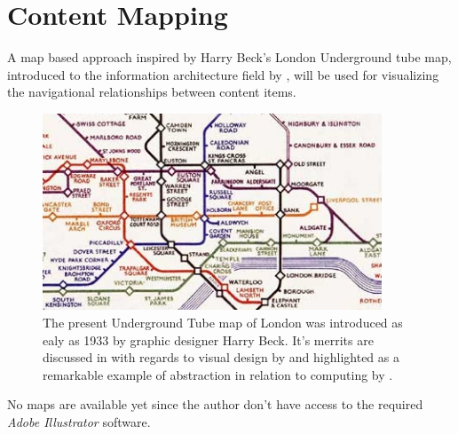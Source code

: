 \chapter{Content Mapping}

\label{appendix:content.mapping}

A map based approach inspired by Harry Beck's London Underground tube
map, introduced to the information
architecture field by \citet{walsh07}, will be used for visualizing the
navigational relationships between content items.
\begin{figure}[h]
  \begin{center}
    \includegraphics[width=0.9\textwidth]{beck_1933_map}
    \caption[1933 London Underground Tube map]{%
      The present Underground Tube map of London was introduced as ealy as
      1933 by graphic designer Harry Beck. It's merrits are discussed
      in with regards to visual design by \citet{hadlaw03} and highlighted as
      a remarkable example of abstraction in relation to computing by
      \citet{kramer07}.}
  \end{center}
\end{figure}

No maps are available yet since the author don't have access to the required
\emph{Adobe Illustrator} software.
